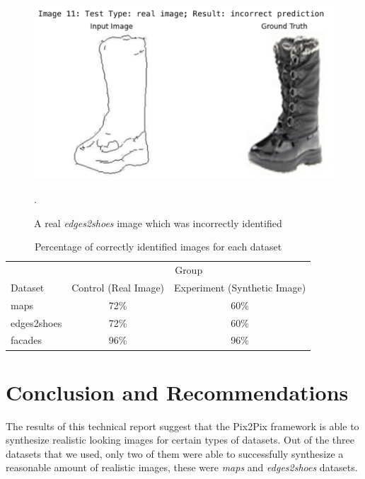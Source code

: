 \documentclass[peerreview]{IEEEtran}
\begin{document}
\begin{figure}[t]
\centering
\includegraphics[width=0.8\columnwidth]{Edges2Shoes real incorrect.png}
\caption{A real \textit{edges2shoes} image which was incorrectly identified}.
\label{fig:edges2shoesrealincorrect}
\end{figure}


\begin{table}
\centering %
\begin{tabular}{l c c} %
\toprule %
& \multicolumn{2}{c}{Group} \\ %
\cmidrule(l){2-3} %
Dataset & Control (Real Image) & Experiment (Synthetic Image)\\ %
\midrule %
maps & 72\% & 60\% \\
edges2shoes & 72\% & 60\% \\
facades & 96\% & 96\% \\
\bottomrule %
\end{tabular}
\smallskip 
\caption{Percentage of correctly identified images for each dataset}
\label{tab:results} 
\end{table}

\section{Conclusion and Recommendations}
The results of this technical report suggest that the Pix2Pix framework is able to synthesize realistic looking images for certain types of datasets. Out of the three datasets that we used, only two of them were able to successfully synthesize a reasonable amount of realistic images, these were \textit{maps} and \textit{edges2shoes} datasets. 
\end{document}
